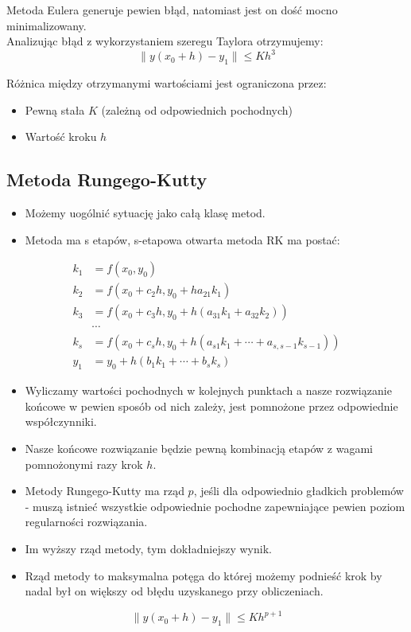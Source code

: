 \documentclass[a4paper]{article}
\begin{document}
Metoda Eulera generuje pewien błąd, natomiast jest on dość mocno minimalizowany. \\ 

Analizując błąd z wykorzystaniem szeregu Taylora otrzymujemy:
\begin{equation*}
    \| y(x_0 + h) - y_1 \| \leq K h^3
\end{equation*}

Różnica między otrzymanymi wartościami jest ograniczona przez:
\begin{itemize}
    \item Pewną stała $K$ (zależną od odpowiednich pochodnych)
    \item Wartość kroku $h$
\end{itemize}

\subsection{Metoda Rungego-Kutty}
\begin{itemize}
    \item Możemy uogólnić sytuację jako całą klasę metod.
    \item Metoda ma s etapów, s-etapowa otwarta metoda RK ma postać:
\end{itemize}

\begin{equation*}
    \begin{split}
        k_1 & = f(x_0, y_0) \\
        k_2 & = f(x_0 + c_2h, y_0 + ha_{21}k_1) \\
        k_3 & = f(x_0 + c_3h, y_0 + h(a_{31}k_1 + a_{32}k_2)) \\
        & \cdots \\
        k_s & = f(x_0 + c_sh, y_0 + h(a_{s1}k_1 + \cdots + a_{s,s-1}k_{s-1})) \\
        y_1 & = y_0 + h(b_1k_1 + \cdots + b_sk_s)
    \end{split}
\end{equation*}

\begin{itemize}
    \item Wyliczamy wartości pochodnych w kolejnych punktach a nasze rozwiązanie końcowe w pewien sposób od nich zależy, jest pomnożone przez odpowiednie współczynniki.
    \item Nasze końcowe rozwiązanie będzie pewną kombinacją etapów z wagami pomnożonymi razy krok $h$.
    \item Metody Rungego-Kutty ma rząd $p$, jeśli dla odpowiednio gładkich problemów - muszą istnieć wszystkie odpowiednie pochodne zapewniające pewien poziom regularności rozwiązania.
    \item Im wyższy rząd metody, tym dokładniejszy wynik.
    \item Rząd metody to maksymalna potęga do której możemy podnieść krok by nadal był on większy od błędu uzyskanego przy obliczeniach.
\end{itemize}

\begin{equation*}
    \|y(x_0 + h) - y_1 \| \leq K h^{p+1}
\end{equation*}
\end{document}
